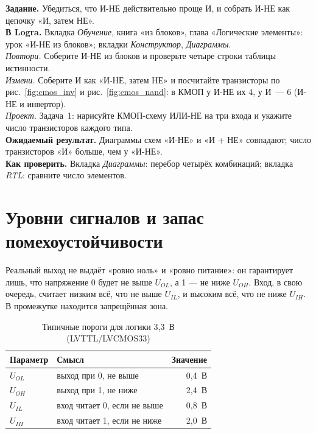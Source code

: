 \begin{diybox}
\textbf{Задание.} Убедиться, что И-НЕ действительно проще И, и собрать И-НЕ
как цепочку «И, затем НЕ».\\
\textbf{В Logra.} Вкладка \emph{Обучение}, книга «из блоков», глава «Логические
элементы»: урок «И-НЕ из блоков»; вкладки \emph{Конструктор},
\emph{Диаграммы}.\\
 \emph{Повтори.} Соберите И-НЕ из блоков и проверьте четыре строки
таблицы истинности.\\
 \emph{Измени.} Соберите И как «И-НЕ, затем НЕ» и посчитайте
транзисторы по рис.~\ref{fig:cmos_inv} и рис.~\ref{fig:cmos_nand}: в КМОП
у И-НЕ их 4, у И~--- 6 (И-НЕ и инвертор).\\
 \emph{Проект.} Задача~1: нарисуйте КМОП-схему ИЛИ-НЕ на три входа и
укажите число транзисторов каждого типа.\\
\textbf{Ожидаемый результат.} Диаграммы схем «И-НЕ» и «И + НЕ» совпадают;
число транзисторов «И» больше, чем у «И-НЕ».\\
\textbf{Как проверить.} Вкладка \emph{Диаграммы}: перебор четырёх комбинаций;
вкладка \emph{RTL}: сравните число элементов.
\end{diybox}

\section{Уровни сигналов и запас помехоустойчивости}

Реальный выход не выдаёт «ровно ноль» и «ровно питание»: он
гарантирует лишь, что напряжение 0 будет не выше $U_{OL}$, а 1 --- не ниже
$U_{OH}$. Вход, в свою очередь, считает низким всё, что не выше $U_{IL}$, и
высоким всё, что не ниже $U_{IH}$. В промежутке находится запрещённая зона.

\begin{table}[H]
\centering
\caption{Типичные пороги для логики 3,3~В (LVTTL/LVCMOS33)}
\small
\begin{tabular}{llr}
\toprule
\textbf{Параметр} & \textbf{Смысл} & \textbf{Значение} \\
\midrule
$U_{OL}$ & выход при 0, не выше & 0,4~В \\
$U_{OH}$ & выход при 1, не ниже & 2,4~В \\
$U_{IL}$ & вход читает 0, если не выше & 0,8~В \\
$U_{IH}$ & вход читает 1, если не ниже & 2,0~В \\
\bottomrule
\end{tabular}
\end{table}

